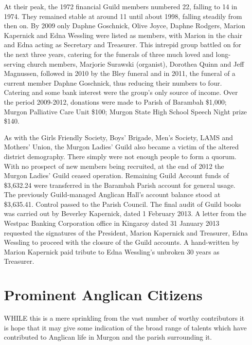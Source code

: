 At their peak, the 1972 financial Guild members numbered 22, falling to 14 in 1974. They remained stable at around 11 until about 1998, falling steadily from then on. By 2009 only Daphne Goschnick, Olive Joyce, Daphne Rodgers, Marion Kapernick and Edna Wessling were listed as members, with Marion in the chair and Edna acting as Secretary and Treasurer. This intrepid group battled on for the next three years, catering for the funerals of three much loved and long-serving church members, Marjorie Surawski (organist), Dorothea Quinn and Jeff Magnussen, followed in 2010 by the Bley funeral and in 2011, the funeral of a current member Daphne Goschnick, thus reducing their numbers to four. Catering and some bank interest were the group's only source of income. Over the period 2009-2012, donations were made to Parish of Barambah \$1,000; Murgon Palliative Care Unit \$100; Murgon State High School Speech Night prize \$140.



As with the Girls Friendly Society, Boys' Brigade, Men's Society, LAMS and Mothers' Union, the Murgon Ladies' Guild also became a victim of the altered district demography. There simply were not enough people to form a quorum. With no prospect of new members being recruited, at the end of 2012 the Murgon Ladies' Guild ceased operation. Remaining Guild Account funds of \$3,632.24 were transferred in the Barambah Parish account for general usage. The previously Guild-managed Anglican Hall's account balance stood at \$3,635.41. Control passed to the Parish Council. The final audit of Guild books was carried out by Beverley Kapernick, dated 1 February 2013. A letter from the Westpac Banking Corporation office in Kingaroy dated 31 January 2013 requested the signatures of the President, Marion Kapernick and Treasurer, Edna Wessling to proceed with the closure of the Guild accounts. A hand-written by Marion Kapernick paid tribute to Edna Wessling's unbroken 30 years as Treasurer.

\balance


\printendnotes[custom]
\setcounter{endnote}{0}
\chapter{Prominent Anglican Citizens}
\nobalance


\lettrine[lines=3]{W}{HILE}
 this is a mere sprinkling from the vast number of worthy contributors it is hope that it may give some indication of the broad range of talents which have contributed to Anglican life in Murgon and the parish surrounding it.


